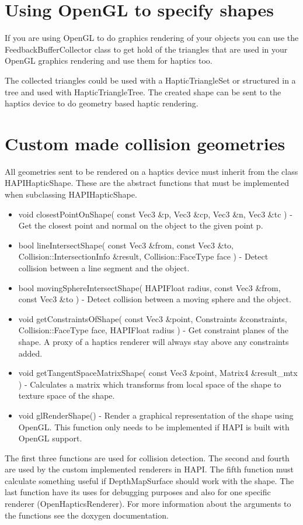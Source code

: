 \section{Using OpenGL to specify shapes}
If you are using OpenGL to do graphics rendering of your objects you
can use the FeedbackBufferCollector class to get hold of the triangles
that are used in your OpenGL graphics rendering and use them for
haptics too. 



The collected triangles could be used with a HapticTriangleSet or structured
in a tree and used with HapticTriangleTree. The created shape can be sent to
the haptics device to do geometry based haptic rendering.

\section{Custom made collision geometries}
All geometries sent to be rendered on a haptics device must
inherit from the class HAPIHapticShape. These are the abstract functions
that must be implemented when subclassing HAPIHapticShape.

\begin{itemize}
\item {\ttfamily void closestPointOnShape( const Vec3 \&p, Vec3 \&cp, Vec3 \&n, Vec3 \&tc )}
- Get the closest point and normal on the object to the given point p.
\item {\ttfamily bool lineIntersectShape( const Vec3 \&from, const Vec3 \&to, Collision::IntersectionInfo \&result, Collision::FaceType face )}
- Detect collision between a line segment and the object.
\item {\ttfamily bool movingSphereIntersectShape( HAPIFloat radius, const Vec3 \&from, const Vec3 \&to )}
- Detect collision between a moving sphere and the object.
\item {\ttfamily void getConstraintsOfShape( const Vec3 \&point, Constraints \&constraints, Collision::FaceType face, HAPIFloat radius )}
- Get constraint planes of the shape. A proxy of a haptics renderer will always stay above any constraints added.
\item {\ttfamily void getTangentSpaceMatrixShape( const Vec3 \&point, Matrix4 \&result\_mtx )}
- Calculates a matrix which transforms from local space of the shape to texture space of the shape.
\item {\ttfamily void glRenderShape() - Render a graphical representation of the shape}
using OpenGL. This function only needs to be implemented if HAPI is built with OpenGL support.
\end{itemize}

The first three functions are used for collision detection. The second and
fourth are used by the custom implemented renderers in HAPI. The fifth
function must calculate something useful if DepthMapSurface should work with
the shape. The last function have its uses for debugging purposes and also for
one specific renderer (OpenHapticsRenderer). For more information about the
arguments to the functions see the doxygen documentation.
